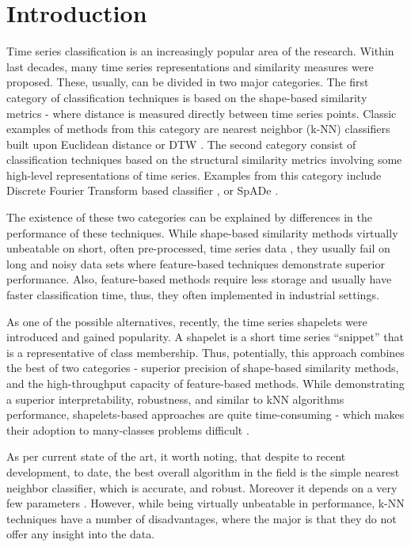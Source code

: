 \documentclass{llncs}
\begin{document}
\section{Introduction}
%
Time series classification is an increasingly popular area of the research. Within last decades,
many time series representations and similarity measures were proposed. These, usually, can be
divided in two major categories. The first category of classification techniques is based on
the shape-based similarity metrics - where distance is measured directly between time series
points. Classic examples of methods from this category are nearest neighbor (k-NN) classifiers
built upon Euclidean distance or DTW \cite{1NN}. The second category consist of classification
techniques based on the structural similarity metrics involving some high-level representations
of time series. Examples from this category include Discrete Fourier Transform based classifier
\cite{DFT}, or SpADe \cite{spade}. 

The existence of these two categories can be explained by differences in the performance of these
techniques. While shape-based similarity methods virtually unbeatable on short, often pre-processed,
time series data \cite{benchmark}, they usually fail on long and noisy data sets \cite{indexing}
where feature-based techniques demonstrate superior performance. Also, feature-based methods
require less storage and usually have faster classification time, thus, they often implemented in
industrial settings. 

As one of the possible alternatives, recently, the time series shapelets were introduced 
\cite{shapelet} and gained popularity. A shapelet is a short time series ``snippet'' that is a 
representative of class membership. Thus, potentially, this approach combines the best of two
categories - superior precision of shape-based similarity methods, and the high-throughput 
capacity of feature-based methods\cite{logical}. While demonstrating a superior interpretability, 
robustness, and similar to kNN algorithms performance, shapelets-based approaches are quite 
time-consuming - which makes their adoption to many-classes problems difficult \cite{bagnal}. 

As per current state of the art, it worth noting, that despite to recent development, to date, the
best overall algorithm in the field is the simple nearest neighbor classifier, which is accurate,
and robust. Moreover it depends on a very few parameters \cite{comparison}
\cite{classifiers} \cite{benchmark}. However, while being virtually unbeatable in performance,
k-NN techniques have a number of disadvantages, where the major is that they do not offer any 
insight into the data.
\end{document}
